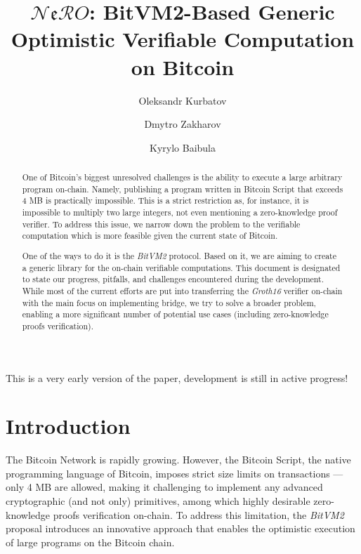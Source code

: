 \documentclass{iacrtrans}
\author{Oleksandr Kurbatov\inst{1} \and Dmytro Zakharov\inst{1} 
\and Kyrylo Baibula \inst{1}}
\institute{Distributed Lab
\email{ok@distributedlab.com}, \email{dmytro.zakharov@distributedlab.com}, \email{kyrylo.baybula@distributedlab.com}}
\title[Verifiable Computation on Bitcoin]{$\mathcal{N}\mathfrak{e}\mathcal{R}O$: BitVM2-Based Generic Optimistic Verifiable Computation on Bitcoin}
\begin{document}
\maketitle


\begin{abstract}
  One of Bitcoin's biggest unresolved challenges is the ability to execute a
  large arbitrary program on-chain. Namely, publishing a program written in
  Bitcoin Script that exceeds 4 MB is practically impossible. This is a strict
  restriction as, for instance, it is impossible to multiply two large integers,
  not even mentioning a zero-knowledge proof verifier. To address this issue, we
  narrow down the problem to the verifiable computation which is more feasible
  given the current state of Bitcoin.

  One of the ways to do it is the \textit{BitVM2} protocol. Based on it, we are aiming to
  create a generic library for the on-chain verifiable computations. This
  document is designated to state our progress, pitfalls, and challenges
  encountered during the development. While most of the current efforts are put into 
  transferring the \textit{Groth16} verifier on-chain with the 
  main focus on implementing bridge, we try to solve
  a broader problem, enabling a more significant number of potential use cases
  (including zero-knowledge proofs verification).
\end{abstract}

\setcounter{tocdepth}{2}
\tableofcontents

\begin{tcolorbox}[colback=green!15!white, halign title=flush center, colframe=green!70!black, fonttitle=\bfseries\large, title=Note, sharp corners]
  \centering This is a very early version of the paper, development is still in
  active progress!
\end{tcolorbox}

\section{Introduction}\label{sec:intro}

The Bitcoin Network \autocite{bitcoin_paper} is rapidly growing. However, the
Bitcoin Script, the native programming language of Bitcoin, imposes strict size
limits on transactions --- only 4 MB are allowed, making it challenging to
implement any advanced cryptographic (and not only) primitives, among which
highly desirable zero-knowledge proofs verification on-chain. To address this
limitation, the \textit{BitVM2} \autocite{bitvm2} proposal introduces an innovative
approach that enables the optimistic execution of large programs on the Bitcoin
chain. 
\end{document}
